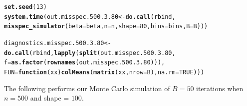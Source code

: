 \documentclass[11pt]{article}\usepackage[]{graphicx}\usepackage[]{color}
\makeatletter
\newcommand{\hlnum}[1]{\textcolor[rgb]{0.686,0.059,0.569}{#1}}%
\newcommand{\hlstd}[1]{\textcolor[rgb]{0.345,0.345,0.345}{#1}}%
\newcommand{\hlkwa}[1]{\textcolor[rgb]{0.161,0.373,0.58}{\textbf{#1}}}%
\newcommand{\hlkwb}[1]{\textcolor[rgb]{0.69,0.353,0.396}{#1}}%
\newcommand{\hlkwc}[1]{\textcolor[rgb]{0.333,0.667,0.333}{#1}}%
\newcommand{\hlkwd}[1]{\textcolor[rgb]{0.737,0.353,0.396}{\textbf{#1}}}%
\newenvironment{kframe}{%
 \def\at@end@of@kframe{}%
 \ifinner\ifhmode%
  \def\at@end@of@kframe{\end{minipage}}%
  \begin{minipage}{\columnwidth}%
 \fi\fi%
 \def\FrameCommand##1{\hskip\@totalleftmargin \hskip-\fboxsep
 \colorbox{shadecolor}{##1}\hskip-\fboxsep
     \hskip-\linewidth \hskip-\@totalleftmargin \hskip\columnwidth}%
 \MakeFramed {\advance\hsize-\width
   \@totalleftmargin\z@ \linewidth\hsize
   \@setminipage}}%
 {\par\unskip\endMakeFramed%
 \at@end@of@kframe}
\newenvironment{knitrout}{}{} %
\makeatother
\begin{document}
\begin{knitrout}
\color{fgcolor}\begin{kframe}
\begin{alltt}
\hlkwd{set.seed}\hlstd{(}\hlnum{13}\hlstd{)}
\hlkwd{system.time}\hlstd{(out.misspec.500.3.80} \hlkwb{<-} \hlkwd{do.call}\hlstd{(rbind,}
  \hlkwd{misspec_simulator}\hlstd{(}\hlkwc{beta} \hlstd{= beta,} \hlkwc{n} \hlstd{= n,} \hlkwc{shape} \hlstd{=} \hlnum{80}\hlstd{,} \hlkwc{bins} \hlstd{= bins,} \hlkwc{B} \hlstd{= B)))}
\end{alltt}


{\ttfamily\noindent\bfseries\color{errorcolor}{\#\# Error in chol.default(crossprod(x) + lambda[j] * diag(v)): the leading minor of order 5 is not positive definite}}

{\ttfamily\noindent\itshape\color{messagecolor}{\#\# Timing stopped at: 0.225 0 0.226}}\begin{alltt}
\hlstd{diagnostics.misspec.500.3.80} \hlkwb{<-} \hlkwd{do.call}\hlstd{(rbind,} \hlkwd{lapply}\hlstd{(}\hlkwd{split}\hlstd{(out.misspec.500.3.80,}
  \hlkwc{f} \hlstd{=} \hlkwd{as.factor}\hlstd{(}\hlkwd{rownames}\hlstd{(out.misspec.500.3.80))),}
  \hlkwc{FUN} \hlstd{=} \hlkwa{function}\hlstd{(}\hlkwc{xx}\hlstd{)} \hlkwd{colMeans}\hlstd{(}\hlkwd{matrix}\hlstd{(xx,} \hlkwc{nrow} \hlstd{= B),} \hlkwc{na.rm} \hlstd{=} \hlnum{TRUE}\hlstd{)))}
\end{alltt}


{\ttfamily\noindent\bfseries\color{errorcolor}{\#\# Error in split(out.misspec.500.3.80, f = as.factor(rownames(out.misspec.500.3.80))): object 'out.misspec.500.3.80' not found}}\end{kframe}
\end{knitrout}


The following performs our Monte Carlo simulation of $B = 50$ iterations 
when $n = 500$ and shape = $100$.
\end{document}

